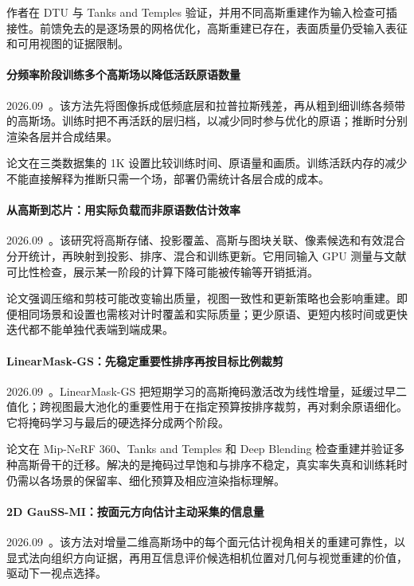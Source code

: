 作者在 DTU 与 Tanks and Temples 验证，并用不同高斯重建作为输入检查可插接性。前馈免去的是逐场景的网格优化，高斯重建已存在，表面质量仍受输入表征和可用视图的证据限制。

\paragraph{分频率阶段训练多个高斯场以降低活跃原语数量}
2026.09~\cite{2609_03334}。该方法先将图像拆成低频底层和拉普拉斯残差，再从粗到细训练各频带的高斯场。训练时把不再活跃的层归档，以减少同时参与优化的原语；推断时分别渲染各层并合成结果。

论文在三类数据集的 1K 设置比较训练时间、原语量和画质。训练活跃内存的减少不能直接解释为推断只需一个场，部署仍需统计各层合成的成本。

\paragraph{从高斯到芯片：用实际负载而非原语数估计效率}
2026.09~\cite{2609_06157}。该研究将高斯存储、投影覆盖、高斯与图块关联、像素候选和有效混合分开统计，再映射到投影、排序、混合和训练更新。它用同输入 GPU 测量与文献可比性检查，展示某一阶段的计算下降可能被传输等开销抵消。

论文强调压缩和剪枝可能改变输出质量，视图一致性和更新策略也会影响重建。即便相同场景和设置也需核对计时覆盖和实际质量；更少原语、更短内核时间或更快迭代都不能单独代表端到端成果。

\paragraph{LinearMask-GS：先稳定重要性排序再按目标比例裁剪}
2026.09~\cite{2609_10095}。LinearMask-GS 把短期学习的高斯掩码激活改为线性增量，延缓过早二值化；跨视图最大池化的重要性用于在指定预算按排序裁剪，再对剩余原语细化。它将掩码学习与最后的硬选择分成两个阶段。

论文在 Mip-NeRF 360、Tanks and Temples 和 Deep Blending 检查重建并验证多种高斯骨干的迁移。解决的是掩码过早饱和与排序不稳定，真实率失真和训练耗时仍需以各场景的保留率、细化预算及相应渲染指标理解。

\paragraph{2D GauSS-MI：按面元方向估计主动采集的信息量}
2026.09~\cite{2609_21516}。该方法对增量二维高斯场中的每个面元估计视角相关的重建可靠性，以显式法向组织方向证据，再用互信息评价候选相机位置对几何与视觉重建的价值，驱动下一视点选择。

